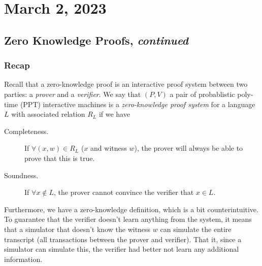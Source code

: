 \section{March 2, 2023}
\label{20230302}
\subsection{Zero Knowledge Proofs, \emph{continued}}
\subsubsection{Recap}
Recall that a zero-knowledge proof is an interactive proof system between two parties: a \emph{prover} and a \emph{verifier}. We say that $(P, V)$ a pair of probablistic poly-time (PPT) interactive machines is a \emph{zero-knowledge proof system} for a language $L$ with associated relation $R_L$ if we have


\begin{description}
    \item[Completeness.] If $\forall (x, w)\in R_L$ ($x$ and witness $w$), the prover will always be able to prove that this is true.
    \item[Soundness.] If $\forall x\not\in L$, the prover cannot convince the verifier that $x\in L$.
\end{description}

Furthermore, we have a zero-knowledge definition, which is a bit counterintuitive. To guarantee that the verifier doesn't learn anything from the system, it means that a simulator that doesn't know the witness $w$ can simulate the entire transcript (all transactions between the prover and verifier). That it, since a simulator can simulate this, the verifier had better not learn any additional information.


